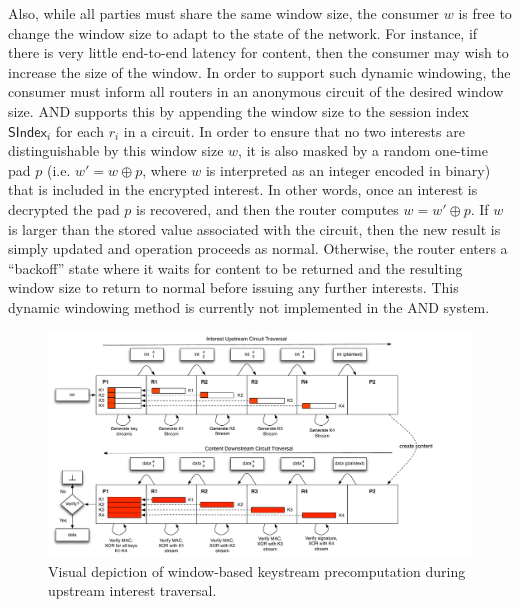 Also, while all parties must share the same window size, the consumer $w$ is free to change the window size to adapt to the state of the network. For instance, if there is very little end-to-end latency for content, then the consumer may wish to increase the size of the window. In order to support such dynamic windowing, the consumer must inform all routers in an anonymous circuit of the desired window size. {\sf AND} supports this by appending the window size to the session index $\mathsf{SIndex}_i$ for each $r_i$ in a circuit. In order to ensure that no two interests are distinguishable by this window size $w$, it is also masked by a random one-time pad $p$ (i.e. $w' = w \oplus p$, where $w$ is interpreted as an integer encoded in binary) that is included in the encrypted interest. In other words, once an interest is decrypted the pad $p$ is recovered, and then the router computes $w = w' \oplus p$. If $w$ is larger than the stored value associated with the circuit, then the new result is simply updated and operation proceeds as normal. Otherwise, the router enters a ``backoff'' state where it waits for content to be returned and the resulting window size to return to normal before issuing any further interests. This dynamic windowing method is currently not implemented in the {\sf AND} system.

\begin{figure}[ht!]
\begin{center}
\includegraphics[scale=0.45]{./images/ctr_split.pdf}
\end{center}
\caption{Visual depiction of window-based keystream precomputation during upstream interest traversal.}
\label{fig:circuit}
\end{figure}
